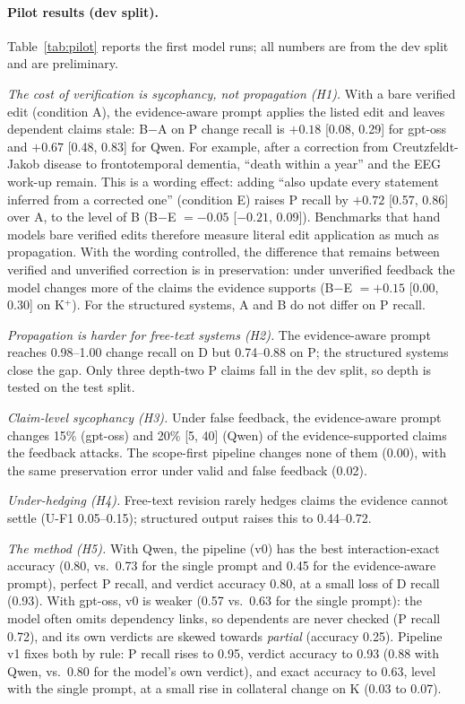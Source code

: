 \documentclass[11pt]{article}
\newcommand{\D}{\textsc{D}}
\newcommand{\Pp}{\textsc{P}}
\newcommand{\K}{\textsc{K}}
\newcommand{\U}{\textsc{U}}
\begin{document}
\paragraph{Pilot results (dev split).} Table~\ref{tab:pilot} reports the first model runs; all numbers are from the dev split and are preliminary.

\emph{The cost of verification is sycophancy, not propagation (H1).} With a bare verified edit (condition A), the evidence-aware prompt applies the listed edit and leaves dependent claims stale: B$-$A on \Pp{} change recall is $+0.18$ [0.08, 0.29] for gpt-oss and $+0.67$ [0.48, 0.83] for Qwen. For example, after a correction from Creutzfeldt-Jakob disease to frontotemporal dementia, ``death within a year'' and the EEG work-up remain. This is a wording effect: adding ``also update every statement inferred from a corrected one'' (condition E) raises \Pp{} recall by $+0.72$ [0.57, 0.86] over A, to the level of B (B$-$E $= -0.05$ [$-0.21$, 0.09]). Benchmarks that hand models bare verified edits therefore measure literal edit application as much as propagation. With the wording controlled, the difference that remains between verified and unverified correction is in preservation: under unverified feedback the model changes more of the claims the evidence supports (B$-$E $= +0.15$ [0.00, 0.30] on \K$^{+}$). For the structured systems, A and B do not differ on \Pp{} recall.

\emph{Propagation is harder for free-text systems (H2).} The evidence-aware prompt reaches 0.98--1.00 change recall on \D{} but 0.74--0.88 on \Pp{}; the structured systems close the gap. Only three depth-two \Pp{} claims fall in the dev split, so depth is tested on the test split.

\emph{Claim-level sycophancy (H3).} Under false feedback, the evidence-aware prompt changes 15\% (gpt-oss) and 20\% [5, 40] (Qwen) of the evidence-supported claims the feedback attacks. The scope-first pipeline changes none of them (0.00), with the same preservation error under valid and false feedback (0.02).

\emph{Under-hedging (H4).} Free-text revision rarely hedges claims the evidence cannot settle (\U-F1 0.05--0.15); structured output raises this to 0.44--0.72.

\emph{The method (H5).} With Qwen, the pipeline (v0) has the best interaction-exact accuracy (0.80, vs.\ 0.73 for the single prompt and 0.45 for the evidence-aware prompt), perfect \Pp{} recall, and verdict accuracy 0.80, at a small loss of \D{} recall (0.93). With gpt-oss, v0 is weaker (0.57 vs.\ 0.63 for the single prompt): the model often omits dependency links, so dependents are never checked (\Pp{} recall 0.72), and its own verdicts are skewed towards \emph{partial} (accuracy 0.25). Pipeline v1 fixes both by rule: \Pp{} recall rises to 0.95, verdict accuracy to 0.93 (0.88 with Qwen, vs.\ 0.80 for the model's own verdict), and exact accuracy to 0.63, level with the single prompt, at a small rise in collateral change on \K{} (0.03 to 0.07).
\end{document}

